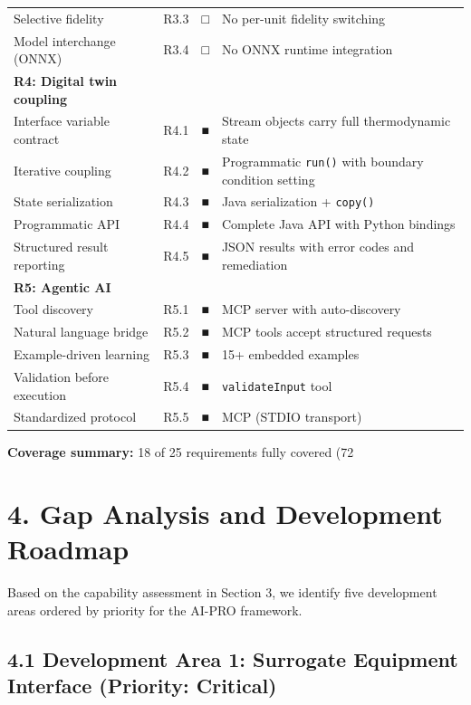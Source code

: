 \documentclass[review,3p]{custom}
\begin{document}
\begin{table}[htbp]
\begin{tabular}{llll}
Selective fidelity & R3.3 & □ & No per-unit fidelity switching \\
Model interchange (ONNX) & R3.4 & □ & No ONNX runtime integration \\
\textbf{R4: Digital twin coupling} \\
Interface variable contract & R4.1 & ■ & Stream objects carry full thermodynamic state \\
Iterative coupling & R4.2 & ■ & Programmatic \texttt{run()} with boundary condition setting \\
State serialization & R4.3 & ■ & Java serialization + \texttt{copy()} \\
Programmatic API & R4.4 & ■ & Complete Java API with Python bindings \\
Structured result reporting & R4.5 & ■ & JSON results with error codes and remediation \\
\textbf{R5: Agentic AI} \\
Tool discovery & R5.1 & ■ & MCP server with auto-discovery \\
Natural language bridge & R5.2 & ■ & MCP tools accept structured requests \\
Example-driven learning & R5.3 & ■ & 15+ embedded examples \\
Validation before execution & R5.4 & ■ & \texttt{validateInput} tool \\
Standardized protocol & R5.5 & ■ & MCP (STDIO transport) \\
\bottomrule
\end{tabular}
\end{table}

\textbf{Coverage summary:} 18 of 25 requirements fully covered (72%


\section{4. Gap Analysis and Development Roadmap}

Based on the capability assessment in Section 3, we identify five development areas ordered by priority for the AI-PRO framework.

\subsection{4.1 Development Area 1: Surrogate Equipment Interface (Priority: Critical)}
\end{document}
